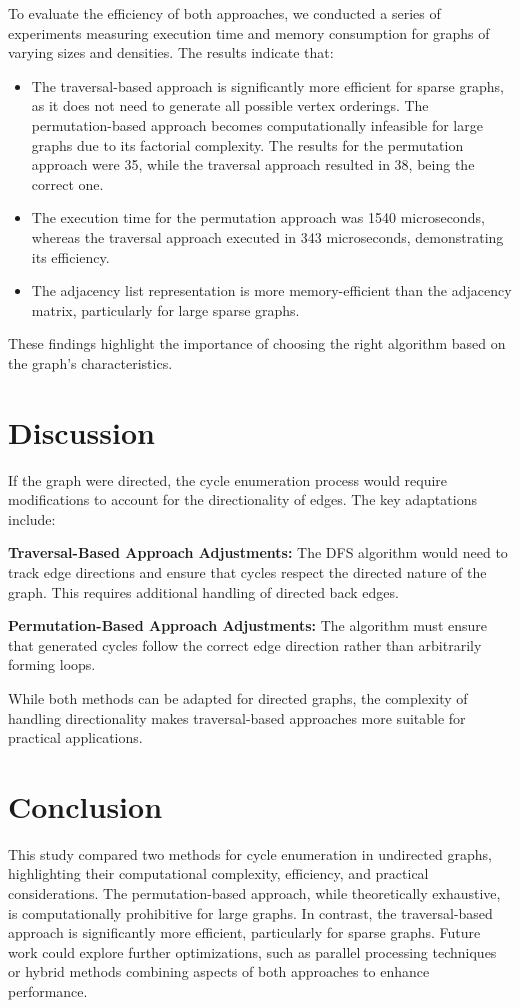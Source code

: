 \documentclass{sbc2023}%
\begin{document}
To evaluate the efficiency of both approaches, we conducted a series of experiments measuring execution time and memory consumption for graphs of varying sizes and densities. The results indicate that:
\begin{itemize}
    \item The traversal-based approach is significantly more efficient for sparse graphs, as it does not need to generate all possible vertex orderings.
    The permutation-based approach becomes computationally infeasible for large graphs due to its factorial complexity. The results for the permutation approach were 35, while the traversal approach resulted in 38, being the correct one.
    \item The execution time for the permutation approach was 1540 microseconds, whereas the traversal approach executed in 343 microseconds, demonstrating its efficiency.
    \item The adjacency list representation is more memory-efficient than the adjacency matrix, particularly for large sparse graphs.
\end{itemize}

These findings highlight the importance of choosing the right algorithm based on the graph’s characteristics.
\section{Discussion}

If the graph were directed, the cycle enumeration process would require modifications to account for the directionality of edges. The key adaptations include:

\textbf{Traversal-Based Approach Adjustments:} The DFS algorithm would need to track edge directions and ensure that cycles respect the directed nature of the graph. This requires additional handling of directed back edges.

\textbf{Permutation-Based Approach Adjustments:} The algorithm must ensure that generated cycles follow the correct edge direction rather than arbitrarily forming loops.

While both methods can be adapted for directed graphs, the complexity of handling directionality makes traversal-based approaches more suitable for practical applications.

\section{Conclusion}

This study compared two methods for cycle enumeration in undirected graphs, highlighting their computational complexity, efficiency, and practical considerations. The permutation-based approach, while theoretically exhaustive, is computationally prohibitive for large graphs. In contrast, the traversal-based approach is significantly more efficient, particularly for sparse graphs. Future work could explore further optimizations, such as parallel processing techniques or hybrid methods combining aspects of both approaches to enhance performance.

\cite{ref1}
\cite{ref2}
\cite{ref3}

\printbibliography[title={References}]
\end{document}
